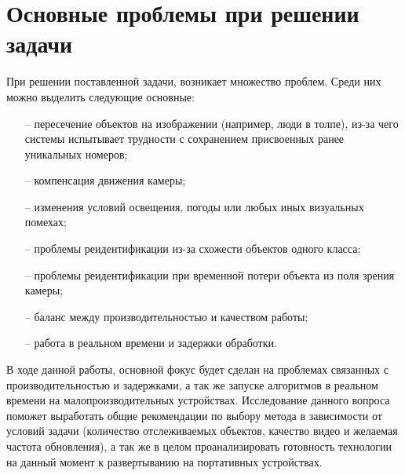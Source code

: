\section{Основные проблемы при решении задачи}
При решении поставленной задачи, возникает множество проблем. Среди них можно выделить следующие основные:
\begin{itemize}
    \item[--] пересечение объектов на изображении (например, люди в толпе), из-за чего системы испытывает трудности с сохранением присвоенных ранее уникальных номеров;
    \item[--] компенсация движения камеры;
    \item[--] изменения условий освещения, погоды или любых иных визуальных помехах;
    \item[--] проблемы реидентификации из-за схожести объектов одного класса;
    \item[--] проблемы реидентификации при временной потери объекта из поля зрения камеры;
    \item[--] баланс между производительностью и качеством работы;
    \item[--] работа в реальном времени и задержки обработки.
\end{itemize}

В ходе данной работы, основной фокус будет сделан на проблемах связанных с производительностью и задержками, а так же запуске алгоритмов в реальном времени на малопроизводительных устройствах. 
Исследование данного вопроса поможет выработать общие рекомендации по выбору метода в зависимости от условий задачи (количество отслеживаемых объектов, качество видео и желаемая частота обновления), а так же в целом проанализировать готовность технологии на данный момент к развертыванию на портативных устройствах.

